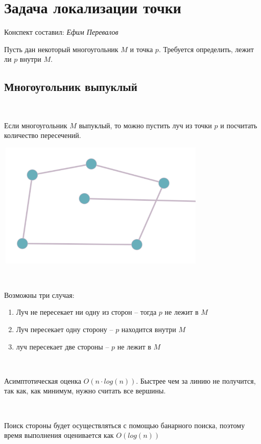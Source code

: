 \section{Задача локализации точки}
\begin{center}
    Конспект составил: \textit{Ефим Перевалов}
\end{center}

Пусть дан некоторый многоугольник $M$ и точка $p$. Требуется определить, лежит ли $p$ внутри $M$.

\subsection{Многоугольник выпуклый}

\

Если многоугольник $M$ выпуклый, то можно пустить луч из точки $p$ и посчитать количество пересечений.

\hspace{1cm} \includegraphics[height=6cm, width=10cm]{vipukli.png}

\

Возможны три случая:
\begin{enumerate}
    \item Луч не пересекает ни одну из сторон -- тогда $p$ не лежит в $M$
    \item Луч пересекает одну сторону -- $p$ находится внутри $M$
    \item луч пересекает две стороны -- $p$ не лежит в $M$
\end{enumerate}

\

Асимптотическая оценка $O(n \cdot log(n))$. Быстрее чем за линию не получится, так как, как минимум, нужно считать все вершины.

\

Поиск стороны будет осуществляться с помощью банарного  поиска, поэтому время выполнения оценивается как $O(log(n))$

